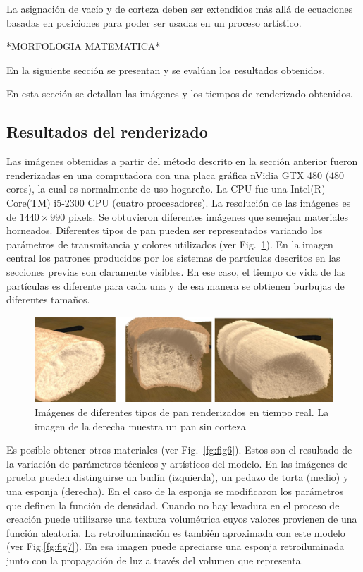 \documentclass[spanish,a4paper,11pt,oneside,links]{report}
\begin{document}
La asignación de vacío y de corteza deben ser extendidos más allá de ecuaciones basadas en posiciones para poder ser usadas en un proceso artístico.

*MORFOLOGIA MATEMATICA*


En la siguiente sección se presentan y se evalúan los resultados obtenidos.

En esta sección se detallan las imágenes y los tiempos de renderizado obtenidos. 

\subsection{Resultados del renderizado}

Las imágenes obtenidas a partir del método descrito en la sección anterior fueron renderizadas en una computadora con una placa gráfica nVidia GTX 480 ($480$ cores), la cual es normalmente de uso hogareño. La CPU fue una Intel(R) Core(TM) i5-2300 CPU (cuatro procesadores). La resolución de las imágenes es de $1440\times990$ pixels. 
Se obtuvieron diferentes imágenes que semejan materiales horneados. Diferentes tipos de pan pueden ser representados variando los parámetros de transmitancia y colores utilizados (ver Fig.~\ref{fg:fig5}). En la imagen central los patrones producidos por los sistemas de partículas descritos en las secciones previas son claramente visibles. En ese caso, el tiempo de vida de las partículas es diferente para cada una y de esa manera se obtienen burbujas de
diferentes tamaños.

\begin{figure}[htb!]
  \centerline{\includegraphics[scale=0.3]{fig5}}
  \caption{Imágenes de diferentes tipos de pan renderizados en tiempo real. La imagen de la derecha muestra un pan sin corteza}
  \label{fg:fig5}
\end{figure}

Es posible obtener otros materiales (ver Fig.~\ref{fg:fig6}). Estos son el resultado de la variación de parámetros técnicos y artísticos del modelo. En las imágenes de prueba pueden distinguirse un budín (izquierda), un pedazo de torta (medio) y una esponja (derecha). En el caso de la esponja se modificaron los parámetros que definen la función de densidad. Cuando no hay levadura en el proceso de creación puede utilizarse una textura volumétrica cuyos valores provienen de una función aleatoria. La retroiluminación es también aproximada con este modelo (ver Fig.\ref{fg:fig7}). En esa imagen puede apreciarse una esponja retroiluminada junto con la propagación de luz a través del volumen que representa.
\end{document}
